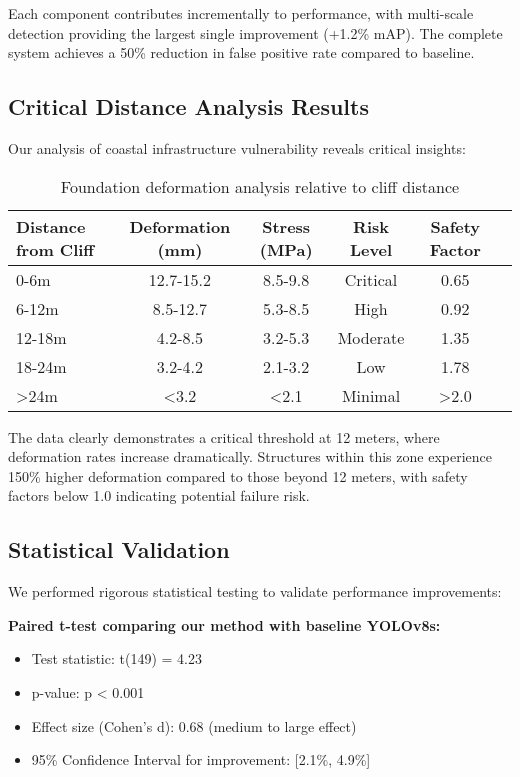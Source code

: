 \documentclass[10pt]{article}
\begin{document}
Each component contributes incrementally to performance, with multi-scale detection providing the largest single improvement (+1.2\% mAP). The complete system achieves a 50\% reduction in false positive rate compared to baseline.

\subsection{Critical Distance Analysis Results}

Our analysis of coastal infrastructure vulnerability reveals critical insights:

\begin{table}[ht]
\centering
\caption{Foundation deformation analysis relative to cliff distance}
\label{tab:critical_distance}
\begin{tabular}{lccccc}
\toprule
Distance from Cliff & Deformation (mm) & Stress (MPa) & Risk Level & Safety Factor \\
\midrule
0-6m & 12.7-15.2 & 8.5-9.8 & Critical & 0.65 \\
6-12m & 8.5-12.7 & 5.3-8.5 & High & 0.92 \\
12-18m & 4.2-8.5 & 3.2-5.3 & Moderate & 1.35 \\
18-24m & 3.2-4.2 & 2.1-3.2 & Low & 1.78 \\
>24m & <3.2 & <2.1 & Minimal & >2.0 \\
\bottomrule
\end{tabular}
\end{table}

The data clearly demonstrates a critical threshold at 12 meters, where deformation rates increase dramatically. Structures within this zone experience 150\% higher deformation compared to those beyond 12 meters, with safety factors below 1.0 indicating potential failure risk.

\subsection{Statistical Validation}

We performed rigorous statistical testing to validate performance improvements:

\textbf{Paired t-test comparing our method with baseline YOLOv8s:}
\begin{itemize}
\item Test statistic: t(149) = 4.23
\item p-value: p < 0.001
\item Effect size (Cohen's d): 0.68 (medium to large effect)
\item 95\% Confidence Interval for improvement: [2.1\%, 4.9\%]
\end{itemize}
\end{document}
